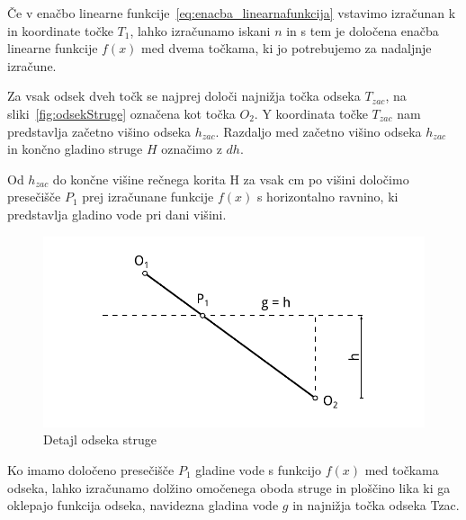 Če v enačbo linearne funkcije~\ref{eq:enacba_linearnafunkcija} vstavimo izračunan k in koordinate točke $T_1$, lahko izračunamo iskani $n$ in s tem je določena enačba linearne funkcije $f(x)$ med dvema točkama, ki jo potrebujemo za nadaljnje izračune. 



Za vsak odsek dveh točk se najprej določi najnižja točka odseka $T_{zac}$, na sliki~\ref{fig:odsekStruge} označena kot točka $O_2$. Y koordinata točke $T_{zac}$ nam predstavlja začetno višino odseka $h_{zac}$. Razdaljo med začetno višino odseka $h_{zac}$ in končno gladino struge $H$ označimo z $dh$.

Od $h_{zac}$ do končne višine rečnega korita H za vsak cm po višini določimo presečišče $P_1$ prej izračunane funkcije $f(x)$ s horizontalno ravnino, ki predstavlja gladino vode pri dani višini. 


\begin{figure}[ht!]
	\begin{centering}
		\includegraphics{slike/customChannel/odsek_detajl.pdf}
		\caption{Detajl odseka struge}
	\end{centering}
\end{figure}



Ko imamo določeno presečišče $P_1$ gladine vode s funkcijo $f(x)$ med točkama odseka, lahko izračunamo dolžino omočenega oboda struge in ploščino lika ki ga oklepajo funkcija odseka, navidezna gladina vode $g$ in najnižja točka odseka T\textunderscore zac.


